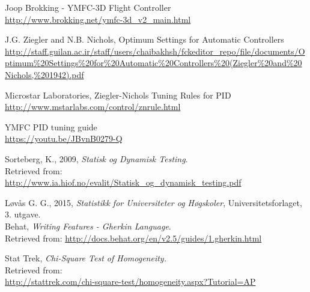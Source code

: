 \begin{thebibliography}{9}
Joop Brokking - YMFC-3D Flight Controller \\
\url{http://www.brokking.net/ymfc-3d_v2_main.html}


             J.G. Ziegler and N.B. Nichols, Optimum Settings for Automatic Controllers \\ 
\url{http://staff.guilan.ac.ir/staff/users/chaibakhsh/fckeditor_repo/file/documents/Optimum\%20Settings\%20for\%20Automatic\%20Controllers\%20(Ziegler\%20and\%20Nichols,\%201942).pdf}

             Microstar Laboratories, Ziegler-Nichols Tuning Rules for PID \\ 
\url{http://www.mstarlabs.com/control/znrule.html}

             YMFC PID tuning guide \\ 
\url{https://youtu.be/JBvnB0279-Q}





  



    





    
    Sorteberg, K., 2009, \textit{Statisk og Dynamisk Testing}. \\
\qquad Retrieved from: \\ \url{http://www.ia.hiof.no/evalit/Statisk_og_dynamisk_testing.pdf}

    Løvås G. G., 2015, \textit{Statistikk for Universiteter og Høgskoler}, Universitetsforlaget, 3. utgave. \\

    Behat, \textit{Writing Features - Gherkin Language}. \\
\qquad Retrieved from: \url{http://docs.behat.org/en/v2.5/guides/1.gherkin.html}

    Stat Trek, \textit{Chi-Square Test of Homogeneity.}\\
\qquad Retrieved from:\\
    \url{http://stattrek.com/chi-square-test/homogeneity.aspx?Tutorial=AP}


\end{thebibliography}
